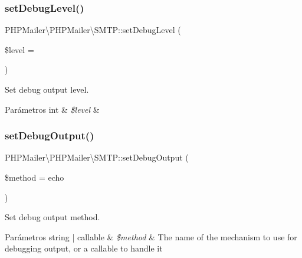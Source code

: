 \subsubsection{\texorpdfstring{set\+Debug\+Level()}{setDebugLevel()}}
{\footnotesize\ttfamily P\+H\+P\+Mailer\textbackslash{}\+P\+H\+P\+Mailer\textbackslash{}\+S\+M\+T\+P\+::set\+Debug\+Level (\begin{DoxyParamCaption}\item[{}]{\$level = {} }\end{DoxyParamCaption})}

Set debug output level.


\begin{DoxyParams}[1]{Parámetros}
int & {\em \$level} & \\
\hline
\end{DoxyParams}
\mbox{\label{classPHPMailer_1_1PHPMailer_1_1SMTP_a3b94bb42d616ad240b54c4556ba82f29}} 
\subsubsection{\texorpdfstring{set\+Debug\+Output()}{setDebugOutput()}}
{\footnotesize\ttfamily P\+H\+P\+Mailer\textbackslash{}\+P\+H\+P\+Mailer\textbackslash{}\+S\+M\+T\+P\+::set\+Debug\+Output (\begin{DoxyParamCaption}\item[{}]{\$method = {\ttfamily \textquotesingle{}echo\textquotesingle{}} }\end{DoxyParamCaption})}

Set debug output method.


\begin{DoxyParams}[1]{Parámetros}
string | callable & {\em \$method} & The name of the mechanism to use for debugging output, or a callable to handle it \\
\hline
\end{DoxyParams}
\mbox{\label{classPHPMailer_1_1PHPMailer_1_1SMTP_af37a69128fef73b63bcbbe5ed1f1e89e}} 
